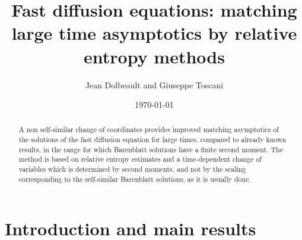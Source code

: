 
\usepackage{amsmath,amsfonts,amssymb,graphicx}
\usepackage{hyperref}

\newtheorem{theorem}{Theorem}
\newtheorem{lemma}[theorem]{Lemma}
\newtheorem{definition}[theorem]{Definition}
\newtheorem{corollary}[theorem]{Corollary}
\newtheorem{proposition}[theorem]{Proposition}
\newtheorem{remark}{\sl Remark}


\title[Asymptotics of fast diffusion equations]{Fast diffusion equations: matching large time asymptotics by relative entropy methods}
\author[J. Dolbeault and G. Toscani]{Jean Dolbeault and Giuseppe Toscani}
\address[J. Dolbeault]
{Ceremade (UMR CNRS no. 7534), Universit\'e Paris-Dauphine, Place de Lattre de Tassigny, F-75775 Paris C\'edex 16, France}
\address[G. Toscani]
{University of Pavia
Department of Mathematics, Via Ferrata~1, 27100 Pavia, Italy}
\date{\today}
\begin{abstract}
A non self-similar change of coordinates provides improved matching asymptotics of the solutions of the fast diffusion equation for large times,
compared to already known results, in the range for which Barenblatt solutions have a finite second moment. The method is based on relative
entropy estimates and a time-dependent change of variables which is determined by second moments, and not by the scaling corresponding to the
self-similar Barenblatt solutions, as it is usually done.
\end{abstract}

\maketitle
\thispagestyle{empty}

\section{Introduction and main results}\label{Sec:Intro}

